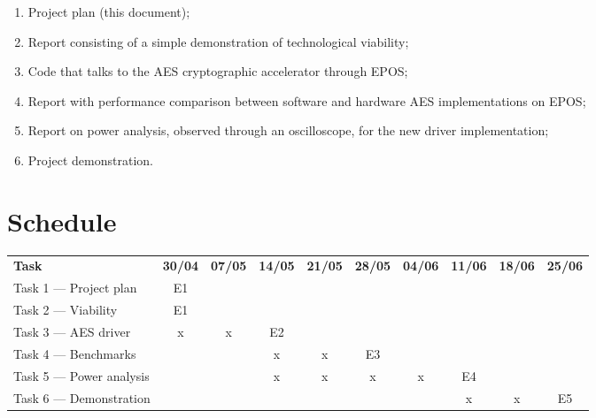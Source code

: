 \documentclass{../sftex/sftex}
\begin{document}
\begin{enumerate}
  \item Project plan (this document);
  \item Report consisting of a simple demonstration of technological viability;
  \item Code that talks to the AES cryptographic accelerator through EPOS\@;
  \item Report with performance comparison between software and hardware AES
  implementations on EPOS\@;
  \item Report on power analysis, observed through an oscilloscope, for the new
  driver implementation;
  \item Project demonstration.
\end{enumerate}

\section{Schedule}

\begin{table}[htbp]
  \centering
  \begin{tabular}{lccccccccc}
    \textbf{Task}           & \textbf{30/04} & \textbf{07/05} & \textbf{14/05}
        & \textbf{21/05} & \textbf{28/05} & \textbf{04/06}
        & \textbf{11/06} & \textbf{18/06} & \textbf{25/06} \\
    Task 1 --- Project plan   & E1             &                &
        &                &                &
        &                &                &                \\
    Task 2 --- Viability      & E1             &                &
        &                &                &
        &                &                &                \\
    Task 3 --- AES driver     & x              & x              & E2
        &                &                &
        &                &                &                \\
    Task 4 --- Benchmarks     &                &                & x
        & x              & E3             &
        &                &                &                \\
    Task 5 --- Power analysis &                &                & x
        & x              & x              & x
        & E4             &                &                \\
    Task 6 --- Demonstration  &                &                &
        &                &                &
        & x              & x              & E5             \\
  \end{tabular}
\end{table}
\end{document}
